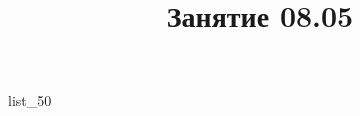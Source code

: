 \documentclass[12pt, a4paper]{article}
\begin{document}
	\title{Занятие 08.05}
	{list_50}
\end{document}
